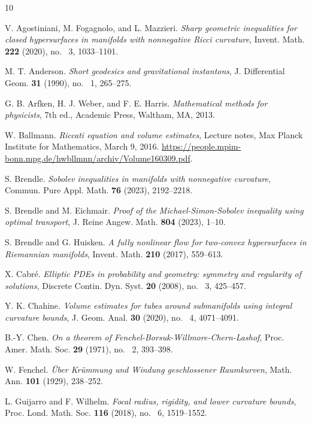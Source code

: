 \documentclass[11pt, reqno]{amsart}
\numberwithin{equation}{section}
\begin{document}
\begin{thebibliography}{10}

V. Agostiniani, M. Fogagnolo, and L. Mazzieri.
\emph{Sharp geometric inequalities for closed hypersurfaces in manifolds with nonnegative Ricci curvature},
Invent. Math. \textbf{222} (2020), no. ~3, 1033--1101.

M. T. Anderson.
\emph{Short geodesics and gravitational instantons},
J. Differential Geom. \textbf{31} (1990), no. ~1, 265--275.

G. B. Arfken, H. J. Weber, and F. E. Harris.
\emph{Mathematical methods for physicists}, 7th ed.,
Academic Press, Waltham, MA, 2013.

W. Ballmann.
\emph{Riccati equation and volume estimates},
Lecture notes, Max Planck Institute for Mathematics, March 9, 2016.
\url{https://people.mpim-bonn.mpg.de/hwbllmnn/archiv/Volume160309.pdf}.

S. Brendle.
\emph{Sobolev inequalities in manifolds with nonnegative curvature},
Commun. Pure Appl. Math. \textbf{76} (2023), 2192--2218.

S. Brendle and M. Eichmair.
\emph{Proof of the Michael-Simon-Sobolev inequality using optimal transport},
J. Reine Angew. Math. \textbf{804} (2023), 1--10.

S. Brendle and G. Huisken.
\emph{A fully nonlinear flow for two-convex hypersurfaces in Riemannian manifolds},
Invent. Math. \textbf{210} (2017), 559--613.

X. Cabr{\'e}.
\emph{Elliptic PDEs in probability and geometry: symmetry and regularity of solutions},
Discrete Contin. Dyn. Syst. \textbf{20} (2008), no. ~3, 425--457.

Y. K. Chahine.
\emph{Volume estimates for tubes around submanifolds using integral curvature bounds},
J. Geom. Anal. \textbf{30} (2020), no. ~4, 4071--4091.

B.-Y. Chen.
\emph{On a theorem of Fenchel-Borsuk-Willmore-Chern-Lashof},
Proc. Amer. Math. Soc. \textbf{29} (1971), no. ~2, 393--398.

W. Fenchel.
\emph{Über Krümmung und Windung geschlossener Raumkurven},
Math. Ann. \textbf{101} (1929), 238--252.

L. Guijarro and F. Wilhelm.
\emph{Focal radius, rigidity, and lower curvature bounds},
Proc. Lond. Math. Soc. \textbf{116} (2018), no. ~6, 1519--1552.


\end{thebibliography}
\end{document}
